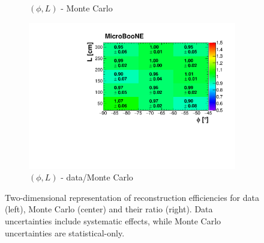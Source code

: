 \documentclass[a4paper,11pt]{article}
\begin{document}
\begin{figure}[htbp]
\begin{subfigure}{0.32\textwidth}
\caption{$(\phi,L)$ - Monte Carlo}
\end{subfigure}\begin{subfigure}{0.32\textwidth}
\includegraphics[width=\linewidth]{figures/phi_l2.pdf}
\caption{$(\phi,L)$ - data/Monte Carlo}
\end{subfigure}
\caption{Two-dimensional representation of reconstruction efficiencies for data (left), Monte Carlo (center) and their ratio (right). Data uncertainties include systematic effects, while Monte Carlo uncertainties are statistical-only.}\label{fig:2d}
\end{figure}
\end{document}
